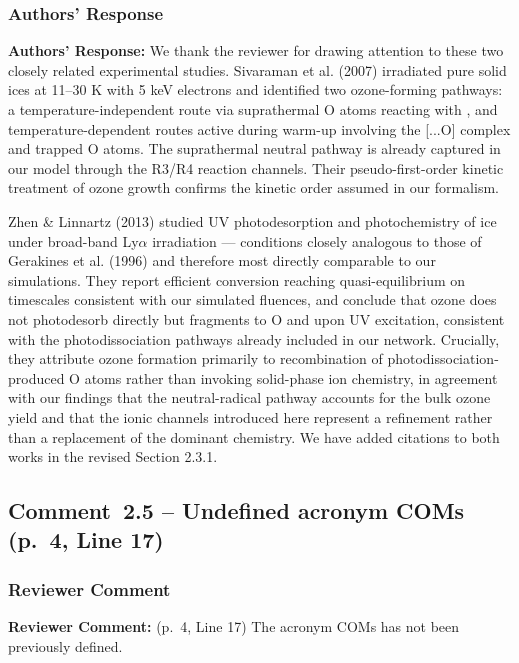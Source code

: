 \documentclass[12pt]{article}
\newcommand{\reviewlabel}{\textbf{\textcolor{commentframe}{Reviewer Comment:}}}
\newcommand{\responselabel}{\textbf{\textcolor{responseframe}{Authors' Response:}}}
\begin{document}
\subsubsection{Authors' Response}
\begin{responsebox}
\responselabel{} 
We thank the reviewer for drawing attention to these two closely related experimental studies. Sivaraman et al. (2007) irradiated pure solid  ices at 11--30 K with 5 keV electrons and identified two ozone-forming pathways: a temperature-independent route via suprathermal O atoms reacting with , and temperature-dependent routes active during warm-up involving the [...O] complex and trapped O atoms. The suprathermal neutral pathway is already captured in our model through the R3/R4 reaction channels. Their pseudo-first-order kinetic treatment of ozone growth confirms the kinetic order assumed in our formalism.

Zhen \& Linnartz (2013) studied UV photodesorption and photochemistry of  ice under broad-band Ly$\alpha$ irradiation — conditions closely analogous to those of Gerakines et al. (1996) and therefore most directly comparable to our simulations. They report efficient  conversion reaching quasi-equilibrium on timescales consistent with our simulated fluences, and conclude that ozone does not photodesorb directly but fragments to O and  upon UV excitation, consistent with the photodissociation pathways already included in our network. Crucially, they attribute ozone formation primarily to recombination of photodissociation-produced O atoms rather than invoking solid-phase ion chemistry, in agreement with our findings that the neutral-radical pathway accounts for the bulk ozone yield and that the ionic channels introduced here represent a refinement rather than a replacement of the dominant chemistry. We have added citations to both works in the revised Section 2.3.1.
\end{responsebox}

\subsection{Comment~2.5 -- Undefined acronym COMs (p.~4, Line 17)}

\subsubsection{Reviewer Comment}
\begin{reviewerbox}
\reviewlabel{} (p.~4, Line 17) The acronym COMs has not been previously
defined.
\end{reviewerbox}
\end{document}
